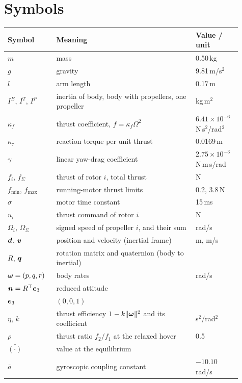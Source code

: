\section{Symbols}\label{app:symbols}
\small
\begin{longtable}{p{0.18\linewidth}p{0.55\linewidth}p{0.18\linewidth}}
\toprule
Symbol & Meaning & Value / unit \\
\midrule
\endhead
$m$ & mass & 0.50\,kg \\
$g$ & gravity & 9.81\,m/s$^2$ \\
$l$ & arm length & 0.17\,m \\
$I^B$, $I^T$, $I^P$ & inertia of body, body with propellers, one propeller & kg\,m$^2$ \\
$\kappa_f$ & thrust coefficient, $f = \kappa_f\Omega^2$ & $6.41\times10^{-6}$\,N\,s$^2$/rad$^2$ \\
$\kappa_\tau$ & reaction torque per unit thrust & 0.0169\,m \\
$\gamma$ & linear yaw-drag coefficient & $2.75\times10^{-3}$\,N\,m\,s/rad \\
$f_i$, $f_\Sigma$ & thrust of rotor $i$, total thrust & N \\
$f_{\min}$, $f_{\max}$ & running-motor thrust limits & 0.2, 3.8\,N \\
$\sigma$ & motor time constant & 15\,ms \\
$u_i$ & thrust command of rotor $i$ & N \\
$\Omega_i$, $\Omega_\Sigma$ & signed speed of propeller $i$, and their sum & rad/s \\
$\boldsymbol{d}$, $\boldsymbol{v}$ & position and velocity (inertial frame) & m, m/s \\
$R$, $\boldsymbol{q}$ & rotation matrix and quaternion (body to inertial) & \\
$\boldsymbol{\omega} = (p,q,r)$ & body rates & rad/s \\
$\boldsymbol{n} = R^\top\boldsymbol{e}_3$ & reduced attitude & \\
$\boldsymbol{e}_3$ & $(0,0,1)$ & \\
$\eta$, $k$ & thrust efficiency $1 - k\|\boldsymbol{\omega}\|^2$ and its coefficient & s$^2$/rad$^2$ \\
$\rho$ & thrust ratio $f_2/f_1$ at the relaxed hover & 0.5 \\
$\bar{(\cdot)}$ & value at the equilibrium & \\
$\bar a$ & gyroscopic coupling constant & $-10.10$\,rad/s \\

\end{longtable}
